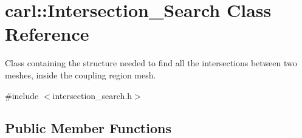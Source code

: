 \hypertarget{classcarl_1_1_intersection___search}{}\section{carl\+:\+:Intersection\+\_\+\+Search Class Reference}
\label{classcarl_1_1_intersection___search}


Class containing the structure needed to find all the intersections between two meshes, inside the coupling region mesh.  




{\ttfamily \#include $<$intersection\+\_\+search.\+h$>$}

\subsection*{Public Member Functions}
